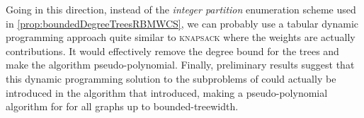		Going in this direction, instead of the \emph{integer partition} enumeration scheme used in \cref{prop:boundedDegreeTreesRBMWCS}, we can probably use a tabular dynamic programming approach quite similar to \textsc{knapsack} where the weights are actually contributions.
		It would effectively remove the degree bound for the trees and make the algorithm pseudo-polynomial.
		Finally, preliminary results suggest that this dynamic programming solution to the subproblems of \rbmwcs{} could actually be introduced in the algorithm that \textcite{bateni2011prize} introduced, making a pseudo-polynomial algorithm for \rbmwcs{} for all graphs up to bounded-treewidth.
